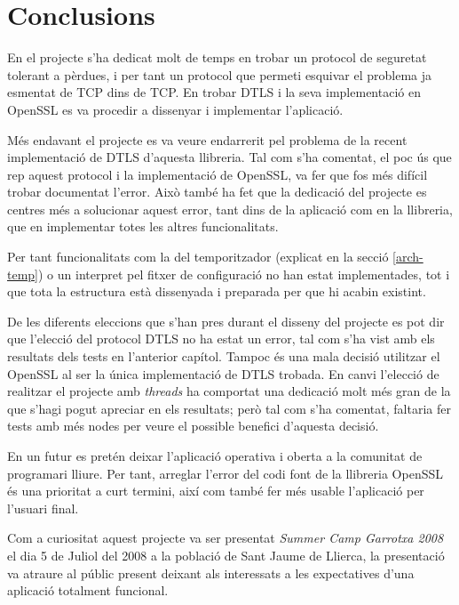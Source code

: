 \chapter{Conclusions}
En el projecte s'ha dedicat molt de temps en trobar un protocol de seguretat tolerant a pèrdues, i per tant un protocol que permeti esquivar el problema ja esmentat de TCP dins de TCP. En trobar DTLS i la seva implementació en OpenSSL es va procedir a dissenyar i implementar l'aplicació.

Més endavant el projecte es va veure endarrerit pel problema de la recent implementació de DTLS d'aquesta llibreria.
Tal com s'ha comentat, el poc ús que rep aquest protocol i la implementació de OpenSSL, va fer que fos més difícil trobar documentat l'error. Això també ha fet que la dedicació del projecte es centres més a solucionar aquest error, tant dins de la aplicació com en la llibreria, que en implementar totes les altres funcionalitats.

Per tant funcionalitats com la del temporitzador (explicat en la secció \ref{arch-temp}) o un interpret pel fitxer de configuració no han estat implementades, tot i que tota la estructura està dissenyada i preparada per que hi acabin existint.

De les diferents eleccions que s'han pres durant el disseny del projecte es pot dir que l'elecció del protocol DTLS no ha estat un error, tal com s'ha vist amb els resultats dels tests en l'anterior capítol. Tampoc és una mala decisió utilitzar el OpenSSL al ser la única implementació de DTLS trobada. En canvi l'elecció de realitzar el projecte amb \emph{threads} ha comportat una dedicació molt més gran de la que s'hagi pogut apreciar en els resultats; però tal com s'ha comentat, faltaria fer tests amb més nodes per veure el possible benefici d'aquesta decisió.

En un futur es pretén deixar l'aplicació operativa i oberta a la comunitat de programari lliure.
Per tant, arreglar l'error del codi font de la llibreria OpenSSL és una prioritat a curt termini, així com també fer més usable l'aplicació per l'usuari final.

Com a curiositat aquest projecte va ser presentat \emph{Summer Camp Garrotxa 2008} el dia 5 de Juliol del 2008 a la població de Sant Jaume de Llierca, la presentació va atraure al públic present deixant als interessats a les expectatives d'una aplicació totalment funcional.
